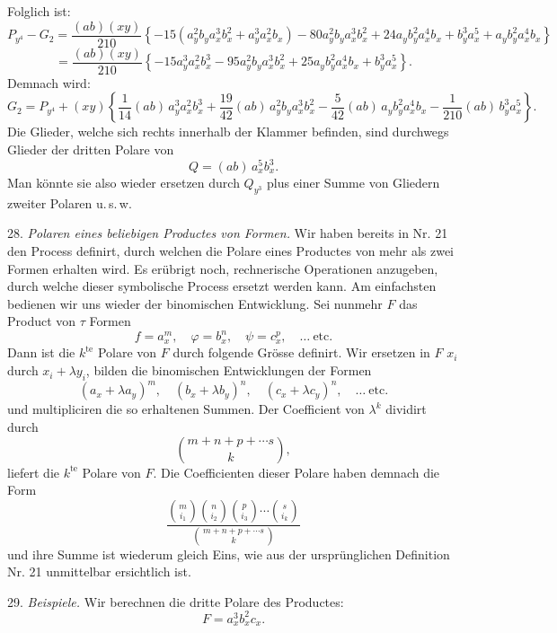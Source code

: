 \documentclass[11pt]{article}
\providecommand{\weberpage}[1]{}
\begin{document}
\weberpage{30}
Folglich ist:
\[
P_{y^4} - G_2 = \frac{(ab)(xy)}{210} \left\{ -15 \left( a_y^2 b_y a_x^3 b_x^2 + a_y^3 a_x^2 b_x \right) - 80 a_y^2 b_y a_x^3 b_x^2 + 24 a_y b_y^2 a_x^4 b_x + b_y^3 a_x^5 + a_y b_y^2 a_x^4 b_x \right\}
\]
\[
= \frac{(ab)(xy)}{210} \left\{ -15 a_y^3 a_x^2 b_x^3 - 95 a_y^2 b_y a_x^3 b_x^2 + 25 a_y b_y^2 a_x^4 b_x + b_y^3 a_x^5 \right\} .
\]
Demnach wird:
\[
G_2 = P_{y^4} + (xy) \left\{ \frac{1}{14} (ab)\, a_y^3 a_x^2 b_x^3 + \frac{19}{42} (ab)\, a_y^2 b_y a_x^3 b_x^2 - \frac{5}{42} (ab)\, a_y b_y^2 a_x^4 b_x - \frac{1}{210} (ab)\, b_y^3 a_x^5 \right\} .
\]
Die Glieder, welche sich rechts innerhalb der Klammer befinden, sind durchwegs Glieder der dritten Polare von
\[
Q = (ab)\, a_x^5 b_x^3 .
\]
Man könnte sie also wieder ersetzen durch $Q_{y^3}$ plus einer Summe von Gliedern zweiter Polaren u.\,s.\,w.

28. \textit{Polaren eines beliebigen Productes von Formen.} Wir haben bereits in Nr. 21 den Process definirt, durch welchen die Polare eines Productes von mehr als zwei Formen erhalten wird. Es erübrigt noch, rechnerische Operationen anzugeben, durch welche dieser symbolische Process ersetzt werden kann. Am einfachsten bedienen wir uns wieder der binomischen Entwicklung. Sei nunmehr $F$ das Product von $\tau$ Formen
\[
f = a_x^m, \quad \varphi = b_x^n, \quad \psi = c_x^p, \quad \ldots \ \text{etc.}
\]
Dann ist die $k^{\text{te}}$ Polare von $F$ durch folgende Grösse definirt. Wir ersetzen in $F$ $x_i$ durch $x_i + \lambda y_i$, bilden die binomischen Entwicklungen der Formen
\[
(a_x + \lambda a_y)^m, \quad (b_x + \lambda b_y)^n, \quad (c_x + \lambda c_y)^n, \quad \ldots \ \text{etc.}
\]
und multipliciren die so erhaltenen Summen. Der Coefficient von $\lambda^k$ dividirt durch
\[
\binom{m+n+p+\cdots s}{k} ,
\]
liefert die $k^{\text{te}}$ Polare von $F$. Die Coefficienten dieser Polare haben demnach die Form
\[
\frac{\binom{m}{i_1}\binom{n}{i_2}\binom{p}{i_3}\cdots\binom{s}{i_k}}{\binom{m+n+p+\cdots s}{k}} %
\]
und ihre Summe ist wiederum gleich Eins, wie aus der ursprünglichen Definition Nr. 21 unmittelbar ersichtlich ist.

29. \textit{Beispiele.} Wir berechnen die dritte Polare des Productes:
\[
F = a_x^3 b_x^2 c_x .
\]
\end{document}
